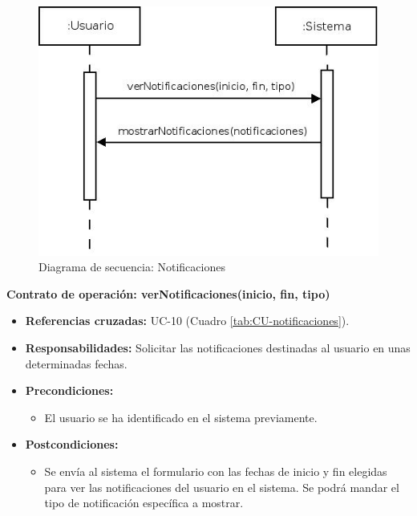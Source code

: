 \vspace{10mm}

\begin{figure}[H]
\centering
  \includegraphics[scale=.50]{img/secuencias/notificaciones.jpeg}
  \caption{Diagrama de secuencia: Notificaciones}
  \label{fig:secuencia-notificaciones}
\end{figure}

\textbf{Contrato de operación: verNotificaciones(inicio, fin, tipo)}
\begin{itemize}
\item \textbf{Referencias cruzadas:} UC-10 (Cuadro \ref{tab:CU-notificaciones}).
\item \textbf{Responsabilidades:} Solicitar las notificaciones destinadas al usuario en unas determinadas fechas.
\item \textbf{Precondiciones:} 
 \begin{itemize}
\item El usuario se ha identificado en el sistema previamente.
\end {itemize}
\item \textbf{Postcondiciones:} 
 \begin{itemize}
\item Se envía al sistema el formulario con las fechas de inicio y fin elegidas para ver las notificaciones del usuario en el sistema. Se podrá mandar el tipo de notificación específica a mostrar.
\end {itemize}
\end {itemize}

